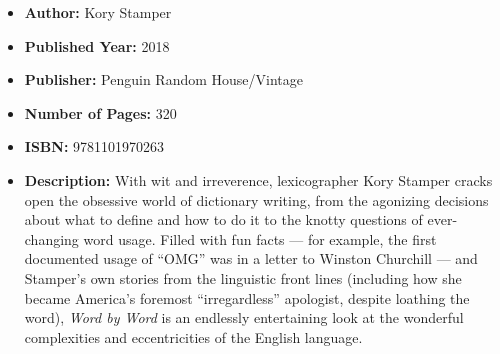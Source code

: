 \documentclass{tufte-handout}
\begin{document}
\begin{itemize}
    \item[] \textbf{Author:} Kory Stamper
    \item[] \textbf{Published Year:} 2018
    \item[] \textbf{Publisher:} Penguin Random House/Vintage
    \item[] \textbf{Number of Pages:} 320   
    \item[] \textbf{ISBN:} 9781101970263
    \item[] \textbf{Description:} With wit and irreverence, lexicographer Kory Stamper cracks open the obsessive world of dictionary writing, from the agonizing decisions about what to define and how to do it to the knotty questions of ever-changing word usage. Filled with fun facts --- for example, the first documented usage of ``OMG'' was in a letter to Winston Churchill --- and Stamper’s own stories from the linguistic front lines (including how she became America’s foremost ``irregardless'' apologist, despite loathing the word), \textit{Word by Word} is an endlessly entertaining look at the wonderful complexities and eccentricities of the English language.
\end{itemize}
\end{document}
